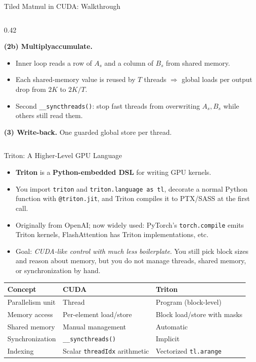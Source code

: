\begin{frame}[fragile]{Tiled Matmul in CUDA: Walkthrough}
\begin{columns}[T]
\begin{column}{0.42\textwidth}
{    \vspace{0.4em}
    \textbf{(2b) Multiply\textendash{}accumulate.}
    \begin{itemize}\itemsep0.1em
      \item Inner loop reads a row of $A_s$ and a column of $B_s$ from shared memory.
      \item Each shared-memory value is reused by $T$ threads $\Rightarrow$ global loads per output drop from $2K$ to $2K/T$.
      \item Second \texttt{\_\_syncthreads()}: stop fast threads from overwriting $A_s, B_s$ while others still read them.
    \end{itemize}

    \vspace{0.4em}
    \textbf{(3) Write-back.} One guarded global store per thread.
    }
  \end{column}
\end{columns}
\end{frame}

\begin{frame}{Triton: A Higher-Level GPU Language}
  \begin{itemize}
    \item \textbf{Triton} \cite{tillet2019triton} is a \textbf{Python-embedded DSL} for writing GPU kernels.
    \item You import \texttt{triton} and \texttt{triton.language as tl}, decorate a normal Python function with \texttt{@triton.jit}, and Triton compiles it to PTX/SASS at the first call.
    \item Originally from OpenAI; now widely used: PyTorch's \texttt{torch.compile} emits Triton kernels, FlashAttention has Triton implementations, etc.
    \item Goal: \emph{CUDA-like control with much less boilerplate}. You still pick block sizes and reason about memory, but you do not manage threads, shared memory, or synchronization by hand.
  \end{itemize}

  \vspace{0.5em}
  \begin{center}
  {\small
  \begin{tabular}{lll}
    \toprule
    \textbf{Concept} & \textbf{CUDA} & \textbf{Triton} \\
    \midrule
    Parallelism unit & Thread & Program (block-level) \\
    Memory access & Per-element load/store & Block load/store with masks \\
    Shared memory & Manual management & Automatic \\
    Synchronization & \texttt{\_\_syncthreads()} & Implicit \\
    Indexing & Scalar \texttt{threadIdx} arithmetic & Vectorized \texttt{tl.arange} \\
    \bottomrule
  \end{tabular}
  }
  \end{center}
\end{frame}

